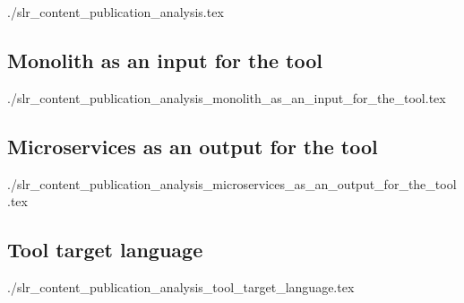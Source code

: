   {./slr_content_publication_analysis.tex}
  \subsection{Monolith as an input for the tool}
  {./slr_content_publication_analysis_monolith_as_an_input_for_the_tool.tex}
  \subsection{Microservices as an output for the tool}
  {./slr_content_publication_analysis_microservices_as_an_output_for_the_tool.tex}
  \subsection{Tool target language}
  {./slr_content_publication_analysis_tool_target_language.tex}
